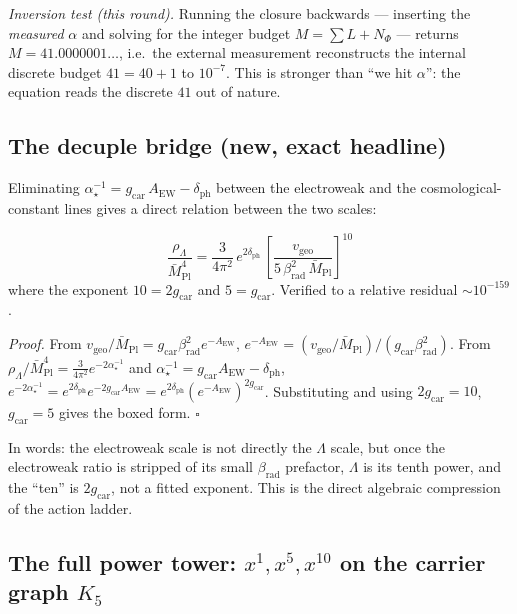 \documentclass[11pt,a4paper]{article}
\newcommand{\Mbar}{\bar M_{\mathrm{Pl}}}
\newcommand{\gcar}{g_{\mathrm{car}}}
\newcommand{\dph}{\delta_{\mathrm{ph}}}
\newcommand{\betarad}{\beta_{\mathrm{rad}}}
\newcommand{\ainv}{\alpha^{-1}_\star}
\newcommand{\AEW}{A_{\mathrm{EW}}}
\theoremstyle{definition}
\begin{document}
\emph{Inversion test (this round).} Running the closure backwards --- inserting the \emph{measured}
$\alpha$ and solving for the integer budget $M=\sum L+N_\Phi$ --- returns
$M=41.0000001\ldots$, i.e.\ the external measurement reconstructs the internal discrete budget
$41=40+1$ to $10^{-7}$. This is stronger than ``we hit $\alpha$'': the equation reads the discrete
$41$ out of nature. \mE

\subsection{The decuple bridge (new, exact headline)}

Eliminating $\ainv=\gcar\,\AEW-\dph$ between the electroweak and the cosmological-constant lines
gives a direct relation between the two scales:

\begin{keybox}
\begin{equation}
  \boxed{\ \frac{\rho_\Lambda}{\Mbar^4}
  =\frac{3}{4\pi^2}\,e^{2\dph}\,
  \left[\frac{v_{\mathrm{geo}}}{5\,\betarad^2\,\Mbar}\right]^{10}\ }
\end{equation}
where the exponent $10=2\gcar$ and $5=\gcar$. Verified to a relative residual $\sim10^{-159}$.
\end{keybox}

\noindent\emph{Proof.} From $v_{\mathrm{geo}}/\Mbar=\gcar\betarad^2 e^{-\AEW}$,
$e^{-\AEW}=(v_{\mathrm{geo}}/\Mbar)/(\gcar\betarad^2)$. From
$\rho_\Lambda/\Mbar^4=\tfrac{3}{4\pi^2}e^{-2\ainv}$ and $\ainv=\gcar\AEW-\dph$,
$e^{-2\ainv}=e^{2\dph}e^{-2\gcar\AEW}=e^{2\dph}(e^{-\AEW})^{2\gcar}$. Substituting and using
$2\gcar=10$, $\gcar=5$ gives the boxed form. $\square$

\smallskip
In words: the electroweak scale is not directly the $\Lambda$ scale, but once the electroweak ratio
is stripped of its small $\betarad$ prefactor, $\Lambda$ is its tenth power, and the ``ten'' is
$2\gcar$, not a fitted exponent. This is the direct algebraic compression of the action ladder.

\subsection{The full power tower: $x^{1},x^{5},x^{10}$ on the carrier graph $K_5$}
\end{document}
